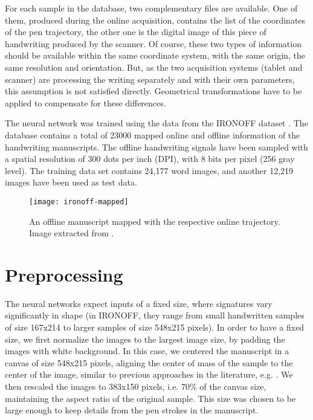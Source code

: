 For each sample in the database, two complementary files are available. One of them, produced during the online acquisition, contains the list of the coordinates of the pen trajectory, the other one is the digital image of this piece of handwriting produced by the scanner. Of course, these two types of information should be available within the same coordinate system, with the same origin, the same resolution and orientation. But, as the two acquisition systems (tablet and scanner) are processing the writing separately and with their own parameters, this assumption is not satisfied directly. Geometrical transformations have to be applied to compensate for these differences.

The neural network was trained using the data from the IRONOFF dataset \cite{viard1999ireste}. The database contains a total of
23000 mapped online and
offline information of the handwriting manuscripts. The
offline handwriting signals have been sampled with a spatial
resolution of 300 dots per inch (DPI), with 8 bits per pixel
(256 gray level). The training data set contains 24,177 word
images, and another 12,219 images have been used as test
data.

\begin{figure}[!htb]
\centering
\texttt{[image: ironoff-mapped]}
\caption{An offline manuscript mapped with the respective online trajectory. Image extracted from \cite{viard1999ireste}.}
\label{fig:ironoff-mapped}
\end{figure}


\section{Preprocessing}
The neural networks expect inputs of a fixed size, where signatures vary significantly in
shape (in IRONOFF, they range from small handwritten samples of size 167x214 to larger samples of size 548x215 pixels). In order to have a fixed size, we first normalize the images to the largest image size, by padding the images with
white background. In this case, we centered the manuscript in
a canvas of size 548x215 pixels, aligning the center of mass
of the sample to the center of the image, similar to previous
approaches in the literature, e.g. \cite{pourshahabi2009offline}. We then rescaled the
images to 383x150 pixels, i.e. 70\% of the canvas size, maintaining the aspect ratio of the original sample. This size was chosen to be large enough to keep
details from the pen strokes in the manuscript.

